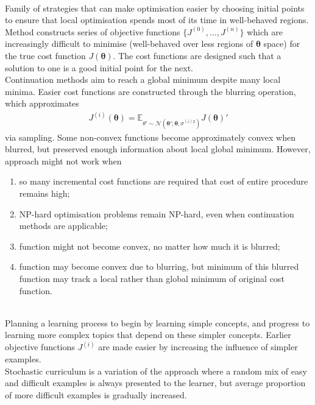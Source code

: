 \begin{remark} \\
Family of strategies that can make optimisation easier by choosing initial points to ensure that local optimisation spends most of its time in well-behaved regions. Method constructs series of objective functions $\{J^{(0)}, \ldots, J^{(n)}\}$ which are increasingly difficult to minimise (well-behaved over less regions of $\bm{\theta}$ space) for the true cost function $J(\bm{\theta})$. The cost functions are designed such that a solution to one is a good initial point for the next.\\
Continuation methods aim to reach a global minimum despite many local minima. Easier cost functions are constructed through the blurring operation, which approximates
\begin{align}
J^{(i)}(\bm{\theta}) = \mathbb{E}_{\theta' \sim \mathcal{N}(\bm{\theta}'; \bm{\theta}, \sigma^{(i)2})} J(\bm{\theta})' \nonumber
\end{align}
via sampling. Some non-convex functions become approximately convex when blurred, but preserved enough information about local global minimum. However, approach might not work when
\begin{enumerate}[label=\roman*.]
\setlength{\itemsep}{0pt}
\item so many incremental cost functions are required that cost of entire procedure remains high;
\item NP-hard optimisation problems remain NP-hard, even when continuation methods are applicable;
\item function might not become convex, no matter how much it is blurred;
\item function may become convex due to blurring, but minimum of this blurred function may track a local rather than global minimum of original cost function.
\end{enumerate}
\end{remark}

\begin{remark} \\
Planning a learning process to begin by learning simple concepts, and progress to learning more complex topics that depend on these simpler concepts. Earlier objective functions $J^{(i)}$ are made easier by increasing the influence of simpler examples.\\
Stochastic curriculum is a variation of the approach where a random mix of easy and difficult examples is always presented to the learner, but average proportion of more difficult examples is gradually increased.
\end{remark}

